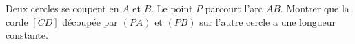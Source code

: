 Deux cercles se coupent en $A$ et $B$. Le point $P$ parcourt l'arc $AB$. Montrer que la corde $[CD]$ découpée par $(PA)$ et $(PB)$ sur l'autre cercle a une longueur constante.
